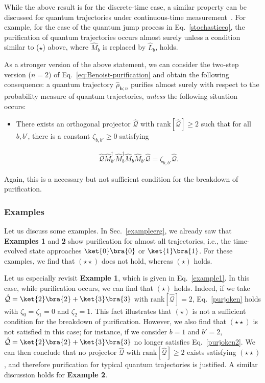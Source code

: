 \documentclass[preprint,pteplogo]{ptephy_v2}%
\numberwithin{equation}{section}
\theoremstyle{definition}
\newcommand{\mc}[1]{\mathcal{#1}}
\newcommand{\ml}[1]{\mathcal{#1}}
\newcommand{\mr}[1]{\mathrm{#1}}
\newcommand{\ketbra}[1]{\ket{#1}\bra{#1}}
\newcommand{\aln}[1]{
\begin{align}
#1
\end{align}
}
\begin{document}
While the above result is for the discrete-time case, a similar property can be discussed for quantum trajectories under continuous-time measurement~\cite{barchielli2003asymptotic, benoist2021invariant}.
For example, for the case of the quantum jump process in Eq.~\eqref{stochasticeq}, the purification of quantum trajectories occurs almost surely unless a condition similar to ($\star$) above, where $\hat{M}_b$ is replaced by $\hat{L}_b$, holds.

As a stronger version of the above statement, we can consider the two-step version ($n=2$) of Eq.~\eqref{eq:Benoist-purification} and obtain the following consequence:
a quantum trajectory $\hat{\rho}_{\bm{b};n}$ purifies almost surely with respect to the probability measure of quantum trajectories, \textit{unless} the following situation occurs:
\begin{itemize}    
\item[($\star\star$)]
There exists an orthogonal projector $\hat{\ml{Q}}$ with $\mr{rank}[\hat{\ml{Q}}]\geq 2$ such that for all $b,b'$, there is a constant $\zeta_{b,b'}\geq0$ satisfying
\aln{\label{purjoken2}
\hat{\ml{Q}}\hat{M}_{b'}^\dag\hat{M}_b^\dag\hat{M}_b\hat{M}_{b'}\hat{\ml{Q}}=\zeta_{b,b'}\hat{\ml{Q}}.
}
\end{itemize}
Again, this is a necessary but not sufficient condition for the breakdown of purification.


\subsubsection{Examples}\label{purex}
Let us discuss some examples. 
In Sec.~\ref{exampleerg}, we already saw that \textbf{Examples 1} and \textbf{2} show purification for almost all trajectories, i.e., the time-evolved state approaches $\ketbra{0}$ or $\ketbra{1}$.
For these examples, we find that $(\star\star)$ does not hold, whereas $(\star)$ holds.

Let us especially revisit \textbf{Example 1}, which is given in Eq.~\eqref{example1}.
In this case, while purification occurs, we can find that $(\star)$ holds.
Indeed, if we take $\hat{\mc{Q}}=\ketbra{2}+\ketbra{3}$ with $\mr{rank}[\mc{\hat{Q}}]=2$, Eq.~\eqref{purjoken} holds with $\zeta_0=\zeta_1=0$ and $\zeta_2=1$.
This fact illustrates that $(\star)$ is not a sufficient condition for the breakdown of purification.
However, we also find that $(\star\star)$ is not satisfied in this case;
for instance, if we consider $b=1$ and $b'=2$, $\hat{\mc{Q}}=\ketbra{2}+\ketbra{3}$ no longer satisfies Eq.~\eqref{purjoken2}.
We can then conclude that no projector $\hat{\mc{Q}}$ with $\mr{rank}[\hat{\mc{Q}}]\geq 2$ exists satisfying $(\star \star)$, and therefore purification for typical quantum trajectories is justified.
A similar discussion holds for \textbf{Example 2}.
\end{document}
